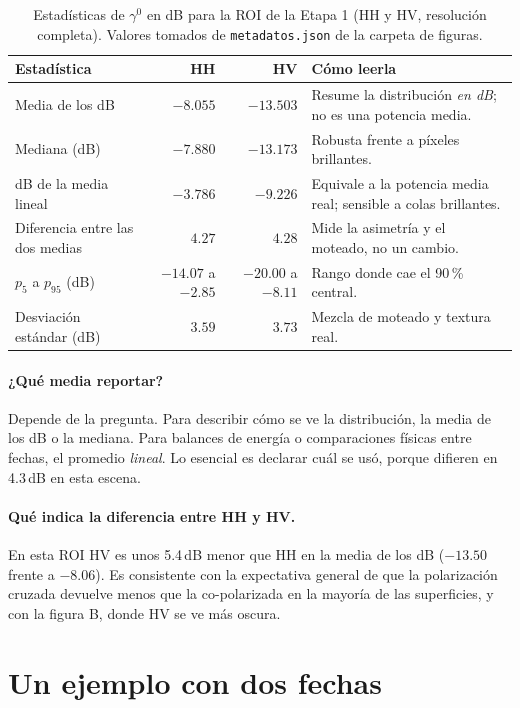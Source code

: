 \documentclass[11pt,a4paper]{article}
\begin{document}
\begin{table}[htbp]
\centering\small
\begin{tabularx}{\linewidth}{p{.3\linewidth}rrX}
\toprule
\textbf{Estadística} & \textbf{HH} & \textbf{HV} & \textbf{Cómo leerla}\\\midrule
Media de los dB & $-8.055$ & $-13.503$ & Resume la distribución \emph{en dB}; no es una potencia media.\\
Mediana (dB) & $-7.880$ & $-13.173$ & Robusta frente a píxeles brillantes.\\
dB de la media lineal & $-3.786$ & $-9.226$ & Equivale a la potencia media real; sensible a colas brillantes.\\
Diferencia entre las dos medias & $4.27$ & $4.28$ & Mide la asimetría y el moteado, no un cambio.\\
$p_5$ a $p_{95}$ (dB) & $-14.07$ a $-2.85$ & $-20.00$ a $-8.11$ & Rango donde cae el 90\,\% central.\\
Desviación estándar (dB) & $3.59$ & $3.73$ & Mezcla de moteado y textura real.\\\bottomrule
\end{tabularx}
\caption{Estadísticas de $\gamma^0$ en dB para la ROI de la Etapa 1 (HH y HV, resolución completa). Valores
tomados de \texttt{metadatos.json} de la carpeta de figuras.}
\label{tab:stats-roi}
\end{table}

\paragraph{¿Qué media reportar?} Depende de la pregunta. Para describir cómo se ve la distribución, la media de
los dB o la mediana. Para balances de energía o comparaciones físicas entre fechas, el promedio \emph{lineal}.
Lo esencial es declarar cuál se usó, porque difieren en 4.3\,dB en esta escena.

\paragraph{Qué indica la diferencia entre HH y HV.} En esta ROI HV es unos 5.4\,dB menor que HH en la media de
los dB ($-13.50$ frente a $-8.06$). Es consistente con la expectativa general de que la polarización cruzada
devuelve menos que la co-polarizada en la mayoría de las superficies, y con la figura B, donde HV se ve más
oscura.

\section{Un ejemplo con dos fechas}
\label{sec:ej-dos-fechas}
\end{document}
